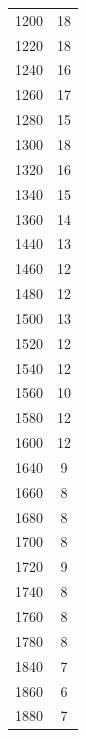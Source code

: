 \begin{table}
\begin{tabular}{c|c}
1200&	18\\ 

1220&	18\\ 

1240&	16	\\ 

1260&	17\\ 

1280&	15\\ 

1300&	18\\ 

1320&	16\\ 

1340&	15\\ 

1360&	14\\ 

1440&	13\\ 

1460&	12\\ 

1480&	12	\\ 

1500&	13\\ 

1520&	12\\ 

1540&	12\\ 

1560&	10	\\ 

1580&	12\\ 

1600&	12\\ 

1640&	9\\ 

1660&	8\\ 

1680&	8\\ 

1700&	8\\ 

1720&	9\\ 

1740&	8\\ 

1760&	8\\ 

1780&	8\\ 

1840&	7\\ 

1860&	6\\ 

1880&	7\\ 


\end{tabular}
\end{table}
